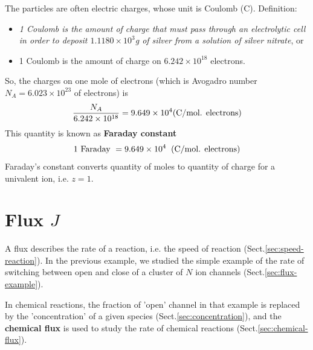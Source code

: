 The particles are often electric charges, whose unit is
Coulomb (C). Definition:
\begin{itemize}
\item {\it 1 Coulomb is the amount of charge that must pass through an
    electrolytic cell in order to deposit $1.1180\times 10^3$g of silver
    from a solution of silver nitrate}, or

\item 1 Coulomb is the amount of charge on $6.242\times 10^{18}$
  electrons. 
\end{itemize}
So, the charges on one mole of electrons (which is Avogadro number
$N_A=6.023\times 10^{23}$ of electrons) is
\begin{equation}
  \label{eq:1343}
  \frac{N_A}{6.242\times 10^{18}} = 9.649\times 10^4 ({\text{C}}/\text{mol. electrons})
\end{equation}
This quantity is known as {\bf Faraday constant}
\begin{equation}
  \label{eq:1344}
  1\text{ Faraday } = 9.649\times 10^4 \;\;({\text{C}}/\text{mol. electrons})
\end{equation}
Faraday's constant converts quantity of moles to quantity of charge for a
univalent ion, i.e. $z=1$. 

\section{Flux $J$}
\label{sec:fluxes}

A flux describes the rate of a reaction, i.e. the speed of reaction
(Sect.\ref{sec:speed-reaction}). In the previous example, we studied the simple
example of the rate of switching between open and close of a cluster of $N$ ion
channels (Sect.\ref{sec:flux-example}).

In chemical reactions, the fraction of 'open' channel in that example is
replaced by the 'concentration' of a given species
(Sect.\ref{sec:concentration}), and the {\bf chemical flux} is used to study the
rate of chemical reactions (Sect.\ref{sec:chemical-flux}).


